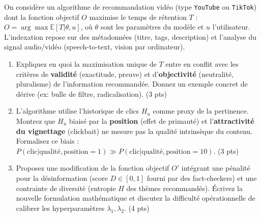 \documentclass[11pt]{article}
\begin{document}
\begin{exercice}
On considère un algorithme de recommandation vidéo (type \texttt{YouTube} ou \texttt{TikTok}) dont la fonction objectif $O$ maximise le temps de rétention $T$ : $O = \arg\max \mathbb{E}[T | \theta, u]$, où $\theta$ sont les paramètres du modèle et $u$ l'utilisateur. L'indexation repose sur des métadonnées (titre, tags, description) et l'analyse du signal audio/vidéo (speech-to-text, vision par ordinateur).
\begin{enumerate}
    \item Expliquez en quoi la maximisation unique de $T$ entre en conflit avec les critères de \textbf{validité} (exactitude, preuve) et d'\textbf{objectivité} (neutralité, pluralisme) de l'information recommandée. Donnez un exemple concret de dérive (ex: bulle de filtre, radicalisation). \hfill (3 pts)
    \item L'algorithme utilise l'historique de clics $H_u$ comme proxy de la pertinence. Montrez que $H_u$ biaisé par la \textbf{position} (effet de primauté) et l'\textbf{attractivité du vignettage} (clickbait) ne mesure pas la qualité intrinsèque du contenu. Formalisez ce biais : $P(\text{clic} | \text{qualité}, \text{position}=1) \gg P(\text{clic} | \text{qualité}, \text{position}=10)$. \hfill (3 pts)
    \item Proposez une modification de la fonction objectif $O'$ intégrant une pénalité pour la désinformation (score $D \in [0,1]$ fourni par des fact-checkers) et une contrainte de diversité (entropie $H$ des thèmes recommandés). Écrivez la nouvelle formulation mathématique et discutez la difficulté opérationnelle de calibrer les hyperparamètres $\lambda_1, \lambda_2$. \hfill (4 pts)
\end{enumerate}
\end{exercice}
\end{document}
